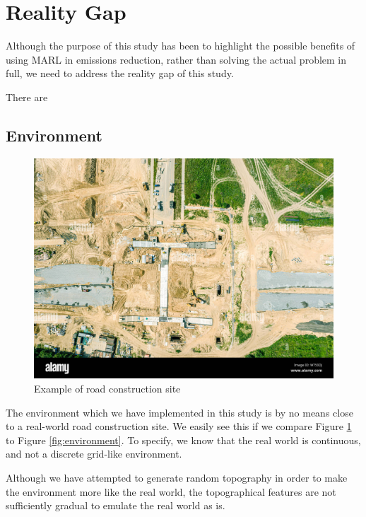 \documentclass[conference]{IEEEtran}
\begin{document}
\section{Reality Gap}
Although the purpose of this study has been to highlight the possible benefits of using MARL in
emissions reduction, rather than solving the actual problem in full, we need to address the reality
gap of this study.

There are 


\subsection{Environment}
\begin{figure}[!ht]
  \includegraphics[width=\columnwidth]{graphs/road-construction-site-example.jpeg}
  \caption{Example of road construction site}
  \label{fig:construction-site}
\end{figure}

The environment which we have implemented in this study is by no means close to a
real-world road construction site. We easily see this if we compare Figure \ref{fig:construction-site}
to Figure \ref{fig:environment}. To specify, we know that the real world is continuous, and not a
discrete grid-like environment.

Although we have attempted to generate random topography in order to make the environment more like
the real world, the topographical features are not sufficiently gradual to emulate the real world as is.
\end{document}

